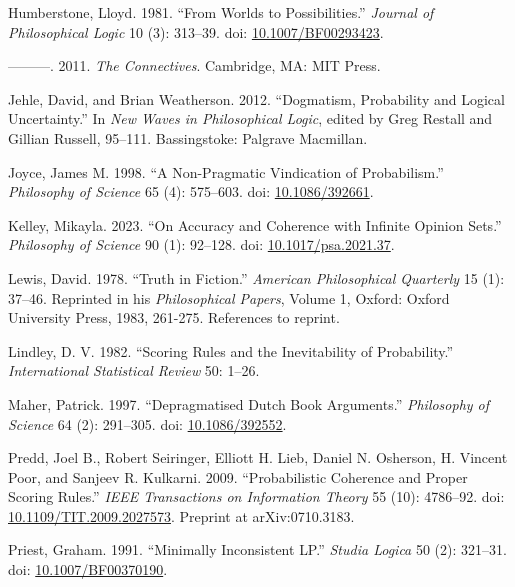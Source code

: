 \documentclass[
  11pt,
  letterpaper,
  DIV=11,
  numbers=noendperiod,
  twoside]{scrartcl}
\newlength{\cslhangindent}
\newenvironment{CSLReferences}[2] %
 {\begin{list}{}{%
  \setlength{\itemindent}{0pt}
  \setlength{\leftmargin}{0pt}
  \setlength{\parsep}{0pt}
  \ifodd #1
   \setlength{\leftmargin}{\cslhangindent}
   \setlength{\itemindent}{-1\cslhangindent}
  \fi
  \setlength{\itemsep}{#2\baselineskip}}}
 {\end{list}}
\begin{document}
\begin{CSLReferences}{1}{0}
Humberstone, Lloyd. 1981. {``From Worlds to Possibilities.''}
\emph{Journal of Philosophical Logic} 10 (3): 313--39. doi:
\href{https://doi.org/10.1007/BF00293423}{10.1007/BF00293423}.

---------. 2011. \emph{The Connectives}. Cambridge, MA: MIT Press.

Jehle, David, and Brian Weatherson. 2012. {``Dogmatism, Probability and
Logical Uncertainty.''} In \emph{New Waves in Philosophical Logic},
edited by Greg Restall and Gillian Russell, 95--111. Bassingstoke:
Palgrave Macmillan.

Joyce, James M. 1998. {``A Non-Pragmatic Vindication of Probabilism.''}
\emph{Philosophy of Science} 65 (4): 575--603. doi:
\href{https://doi.org/10.1086/392661}{10.1086/392661}.

Kelley, Mikayla. 2023. {``On Accuracy and Coherence with Infinite
Opinion Sets.''} \emph{Philosophy of Science} 90 (1): 92--128. doi:
\href{https://doi.org/10.1017/psa.2021.37}{10.1017/psa.2021.37}.

Lewis, David. 1978. {``Truth in Fiction.''} \emph{American Philosophical
Quarterly} 15 (1): 37--46. Reprinted in his \emph{Philosophical Papers},
Volume 1, Oxford: Oxford University Press, 1983, 261-275. References to
reprint.

Lindley, D. V. 1982. {``Scoring Rules and the Inevitability of
Probability.''} \emph{International Statistical Review} 50: 1--26.

Maher, Patrick. 1997. {``Depragmatised Dutch Book Arguments.''}
\emph{Philosophy of Science} 64 (2): 291--305. doi:
\href{https://doi.org/10.1086/392552}{10.1086/392552}.

Predd, Joel B., Robert Seiringer, Elliott H. Lieb, Daniel N. Osherson,
H. Vincent Poor, and Sanjeev R. Kulkarni. 2009. {``Probabilistic
Coherence and Proper Scoring Rules.''} \emph{IEEE Transactions on
Information Theory} 55 (10): 4786--92. doi:
\href{https://doi.org/10.1109/TIT.2009.2027573}{10.1109/TIT.2009.2027573}.
Preprint at arXiv:0710.3183.

Priest, Graham. 1991. {``Minimally Inconsistent {LP}.''} \emph{Studia
Logica} 50 (2): 321--31. doi:
\href{https://doi.org/10.1007/BF00370190}{10.1007/BF00370190}.


\end{CSLReferences}
\end{document}
